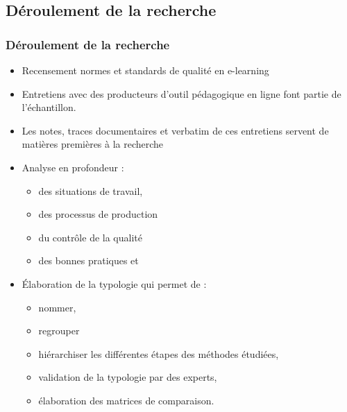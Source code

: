                        	\subsection{Déroulement de la recherche} 
					\begin{frame}[allowframebreaks]
						\frametitle{Déroulement de la recherche}
                        
                        			\begin{itemize} 
                       				 \item Recensement normes et standards de qualité en e-learning
                       				 \item Entretiens avec des producteurs d’outil pédagogique en ligne font partie de l’échantillon. 
                       				 \item Les notes, traces documentaires et verbatim de ces entretiens servent de matières premières à la recherche 
                       				 \item Analyse en profondeur :
                       				 \begin{itemize} 
                       				 	\item des situations de travail, 
                       				 	\item des processus de production
                       				 	\item du contrôle de la qualité
                       				 	\item des bonnes pratiques et 
                       				 \end{itemize}
                       				 \item Élaboration de la typologie qui permet de :
                       				 \begin{itemize} 
                       				 	\item nommer,
                       				 	\item regrouper 
                       				 	\item hiérarchiser les différentes étapes des méthodes étudiées,
                       				 	\item validation de la typologie par des experts, 
                       				 	\item élaboration des matrices de comparaison.
							\end{itemize}
                       		 \end{itemize}

             
                \end{frame}

